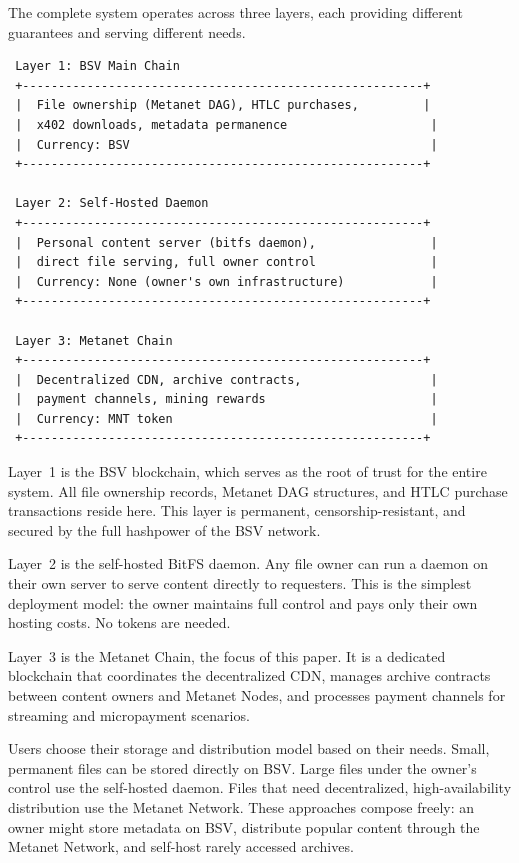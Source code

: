 \documentclass[11pt,a4paper]{article}
\begin{document}
The complete system operates across three layers, each providing different guarantees and serving different needs.

\begin{lstlisting}
 Layer 1: BSV Main Chain
 +--------------------------------------------------------+
 |  File ownership (Metanet DAG), HTLC purchases,         |
 |  x402 downloads, metadata permanence                    |
 |  Currency: BSV                                          |
 +--------------------------------------------------------+

 Layer 2: Self-Hosted Daemon
 +--------------------------------------------------------+
 |  Personal content server (bitfs daemon),                |
 |  direct file serving, full owner control                |
 |  Currency: None (owner's own infrastructure)            |
 +--------------------------------------------------------+

 Layer 3: Metanet Chain
 +--------------------------------------------------------+
 |  Decentralized CDN, archive contracts,                  |
 |  payment channels, mining rewards                       |
 |  Currency: MNT token                                    |
 +--------------------------------------------------------+
\end{lstlisting}

Layer~1 is the BSV blockchain, which serves as the root of trust for the entire system. All file ownership records, Metanet DAG structures, and HTLC purchase transactions reside here. This layer is permanent, censorship-resistant, and secured by the full hashpower of the BSV network.

Layer~2 is the self-hosted BitFS daemon. Any file owner can run a daemon on their own server to serve content directly to requesters. This is the simplest deployment model: the owner maintains full control and pays only their own hosting costs. No tokens are needed.

Layer~3 is the Metanet Chain, the focus of this paper. It is a dedicated blockchain that coordinates the decentralized CDN, manages archive contracts between content owners and Metanet Nodes, and processes payment channels for streaming and micropayment scenarios.

Users choose their storage and distribution model based on their needs. Small, permanent files can be stored directly on BSV. Large files under the owner's control use the self-hosted daemon. Files that need decentralized, high-availability distribution use the Metanet Network. These approaches compose freely: an owner might store metadata on BSV, distribute popular content through the Metanet Network, and self-host rarely accessed archives.
\end{document}

